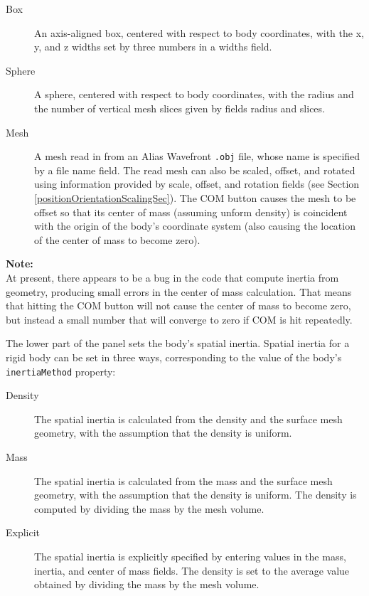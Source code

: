 \documentclass{article}
\begin{document}
\begin{description}

\item[Box]\mbox{}

An axis-aligned box, centered with respect to body coordinates, with
the x, y, and z widths set by three numbers in a {\sf widths} field.

\item[Sphere]\mbox{}

A sphere, centered with respect to body coordinates, with
the radius and the number of vertical mesh slices given
by fields {\sf radius} and {\sf slices}.

\item[Mesh]\mbox{}
 A mesh read in from an Alias Wavefront {\tt .obj} file, whose name
is specified by a {\sf file name} field. The read mesh can also be scaled,
offset, and rotated using information provided by {\sf scale}, {\sf offset},
and {\sf rotation} fields (see Section \ref{positionOrientationScalingSec}). 
The {\sf COM}
button causes the mesh to be offset so that its center of mass
(assuming unform density) is coincident with the origin of the body's
coordinate system (also causing the location of the center of mass to
become zero).

\end{description}

\begin{sideblock}
{\bf Note:}\\ 
At present, there appears to be a bug in the code that compute
inertia from geometry, producing small errors in the center of mass
calculation. That means that hitting the {\sf COM} button will not cause
the center of mass to become zero, but instead a small number that
will converge to zero if {\sf COM} is hit repeatedly.
\end{sideblock}

The lower part of the panel sets the body's spatial inertia.
Spatial inertia for a rigid body can be set in three ways,
corresponding to the value of the body's {\tt inertiaMethod} property:

\begin{description}

\item[Density]\mbox{}
 
The spatial inertia is calculated from the density and the surface
mesh geometry, with the assumption that the density is uniform.

\item[Mass]\mbox{}

The spatial inertia is calculated from the mass and the surface
mesh geometry, with the assumption that the density is uniform.
The density is computed by dividing the mass by the mesh volume.

\item[Explicit]\mbox{}

The spatial inertia is explicitly specified by entering
values in the mass, inertia, and center of mass fields. The density is
set to the average value obtained by dividing the mass by the
mesh volume.

\end{description}
\end{document}
